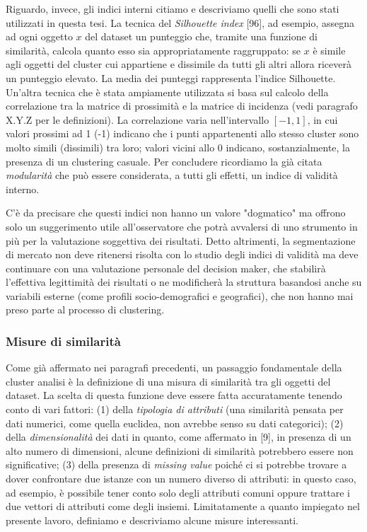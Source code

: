 Riguardo, invece, gli indici interni citiamo e descriviamo quelli che sono stati utilizzati in questa tesi. La tecnica del \textit{Silhouette index} [96], ad esempio, assegna ad ogni oggetto $ x $ del dataset un punteggio che, tramite una funzione di similarit\`a, calcola quanto esso sia appropriatamente raggruppato: se $ x $ \`e simile agli oggetti del cluster cui appartiene e dissimile da tutti gli altri allora ricever\`a un punteggio elevato. La media dei punteggi rappresenta l'indice Silhouette.
Un'altra tecnica che \`e stata ampiamente utilizzata si basa sul calcolo della correlazione tra la matrice di prossimit\`a e la matrice di incidenza (vedi paragrafo X.Y.Z per le definizioni). La correlazione varia nell'intervallo $ [-1, 1] $, in cui valori prossimi ad 1 (-1) indicano che i punti appartenenti allo stesso cluster sono molto simili (dissimili) tra loro; valori vicini allo 0 indicano, sostanzialmente, la presenza di un clustering casuale. Per concludere ricordiamo la gi\`a citata \textit{modularit\`a} che pu\`o essere considerata, a tutti gli effetti, un indice di validit\`a interno.

C'\`e da precisare che questi indici non hanno un valore "dogmatico" ma offrono solo un suggerimento utile all'osservatore che potr\`a avvalersi di uno strumento in pi\`u per la valutazione soggettiva dei risultati. Detto altrimenti, la segmentazione di mercato non deve ritenersi risolta con lo studio degli indici di validit\`a ma deve continuare con una valutazione personale del decision maker, che stabilir\`a l'effettiva legittimit\`a dei risultati o ne modificher\`a la struttura basandosi anche su variabili esterne (come profili socio-demografici e geografici), che non hanno mai preso parte al processo di clustering.

\subsubsection{Misure di similarit\`a}
Come gi\`a affermato nei paragrafi precedenti, un passaggio fondamentale della cluster analisi \`e la definizione di una misura di similarit\`a tra gli oggetti del dataset. La scelta di questa funzione deve essere fatta accuratamente tenendo conto di vari fattori: (1) della \textit{tipologia di attributi} (una similarit\`a pensata per dati numerici, come quella euclidea, non avrebbe senso su dati categorici); (2) della \textit{dimensionalit\`a} dei dati in quanto, come affermato in [9], in presenza di un alto numero di dimensioni, alcune definizioni di similarit\`a potrebbero essere non significative; (3) della presenza di \textit{missing value} poich\'e ci si potrebbe trovare a dover confrontare due istanze con un numero diverso di attributi: in questo caso, ad esempio, \`e possibile tener conto solo degli attributi comuni oppure trattare i due vettori di attributi come degli insiemi. Limitatamente a quanto impiegato nel presente lavoro, definiamo e descriviamo alcune misure interessanti.

